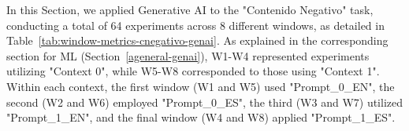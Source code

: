 

In this Section, we applied Generative AI to the "Contenido Negativo" task, conducting a total of 64 experiments across 8 different windows, as detailed in Table~\ref{tab:window-metrics-cnegativo-genai}. As explained in the corresponding section for ML (Section~\ref{ageneral-genai}), W1-W4 represented experiments utilizing "Context 0", while W5-W8 corresponded to those using "Context 1". Within each context, the first window (W1 and W5) used "Prompt\_0\_EN", the second (W2 and W6) employed "Prompt\_0\_ES", the third (W3 and W7) utilized "Prompt\_1\_EN", and the final window (W4 and W8) applied "Prompt\_1\_ES".


\begin{table}[H]
    \centering
    \begingroup
    \small %
\end{table}

